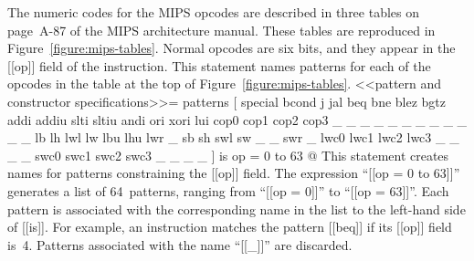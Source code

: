 The numeric codes for the MIPS opcodes are described in three
tables on page~A-87 of the MIPS architecture manual.
These tables are reproduced in Figure~\ref{figure:mips-tables}.
Normal opcodes are six bits, and they appear in the [[op]] field of the
instruction.
This statement names patterns for each of the opcodes in the table at
the top of Figure~\ref{figure:mips-tables}.
<<pattern and constructor specifications>>=
patterns
 [ special bcond   j       jal     beq     bne     blez    bgtz
   addi    addiu   slti    sltiu   andi    ori     xori    lui
   cop0    cop1    cop2    cop3    _       _       _       _
   _       _       _       _       _       _       _       _
   lb      lh      lwl     lw      lbu     lhu     lwr     _
   sb      sh      swl     sw      _       _       swr     _
   lwc0    lwc1    lwc2    lwc3    _       _       _       _
   swc0    swc1    swc2    swc3    _       _       _       _ ] 
 is op = {0 to 63}
@ This statement creates names for patterns constraining the [[op]]
field.
The expression ``[[op = {0 to 63}]]'' generates a list of 64~patterns,
ranging from ``[[op = 0]]'' to ``[[op = 63]]''.
Each pattern is associated with the corresponding name in the list to
the left-hand side of [[is]].
For example, an instruction matches the pattern [[beq]] if its [[op]] field
is~4.
Patterns associated with the name ``[[_]]'' are discarded.

